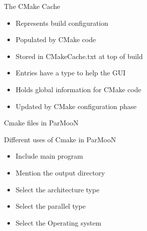 \documentclass[xcolor=x11names,compress]{beamer}
\renewcommand{\(}{\begin{columns}}
\renewcommand{\)}{\end{columns}}
\newcommand{\<}[1]{\begin{column}{#1}}
\renewcommand{\>}{\end{column}}
\begin{document}
\begin{frame}{The CMake Cache}
\begin{itemize}
\item Represents build configuration
\item Populated by CMake code
\item Stored in CMakeCache.txt at top of build
\item Entries have a type to help the GUI
\item Holds global information for CMake code
\item Updated by CMake configuration phase
	\end{itemize}
\end{frame}

\begin{frame}{Cmake files in ParMooN}
	\newline 
\end{frame}

\begin{frame}{Different uses of Cmake in ParMooN}
	\begin{itemize}
		\item Include main program 
		\item Mention the output directory
		\item Select the architecture type
		\item Select the parallel type
		\item Select the Operating system
	\end{itemize}
\end{frame}
\end{document}
